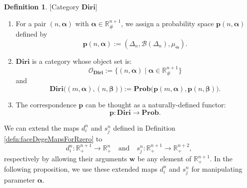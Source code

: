 \documentclass[12pt, a4paper]{amsart}
\theoremstyle{plain}
\theoremstyle{definition}
\newtheorem{defn}[thm]{Definition}
\numberwithin{figure}{section}
\numberwithin{table}{section}
\numberwithin{equation}{section}
\newcommand{\Prob}{\mathbf{Prob}}
\newcommand{\bSigma}{\mathbf{\Sigma}}
\begin{document}
\begin{defn}{[Category $\mathbf{Diri}$]}
\label{defn:catDiri}
\begin{enumerate}
\item
For
a pair
$
	(n, \boldsymbol{\alpha})
$
with
$
	\boldsymbol{\alpha}
		\in
	\mathbb{R}_{\#}^{n+1}
$,
we assign a probability space
$
\mathbf{p}
	(n, \boldsymbol{\alpha})
$
defined by
\begin{equation}
\label{eq:diriProbSp}
\mathbf{p}
(n, \boldsymbol{\alpha})
		:=
(
	\Delta_n, \mathcal{B}(\Delta_n),
	\mu_{
		\boldsymbol{\alpha}
	}
) .
\end{equation}

\item
$
\mathbf{Diri}
$
is a category
whose object set is:
\begin{equation}
\label{eq:catDiriObj}
\mathcal{O}_{\mathbf{Diri}}
	:=
\{
	(n, \boldsymbol{\alpha})
\mid
	\boldsymbol{\alpha}
		\in
	\mathbb{R}_{\#}^{n+1}
\}
\end{equation}
and
\begin{equation}
\label{eq:catDiriArrow}
\mathbf{Diri}
\big(
	(m, \boldsymbol{\alpha}),
	(n, \boldsymbol{\beta})
\big)
		:=
\Prob\big(
	\mathbf{p}(m, \boldsymbol{\alpha}),
	\mathbf{p}(n, \boldsymbol{\beta})
\big) .
\end{equation}

\item
The correspondence
$
\mathbf{p}
$
can be thought as a naturally-defined functor:
\[
\mathbf{p}
	:
\mathbf{Diri}
	\to
\Prob .
\]
\end{enumerate}
\end{defn}




We can extend the maps 
$d^n_i$
and
$s^n_j$
defined in
Definition \ref{defn:faceDegeMapsForRzero}
to
\[
d^n_i
	:
\mathbb{R}_+^{n+1}
	\to
\mathbb{R}_+^{n}
	\quad
\textrm{and}
	\quad
s^n_j
	:
\mathbb{R}_+^{n+1}
	\to
\mathbb{R}_+^{n+2},
\]
respectively
by allowing their arguments
$\mathbf{w}$
be any element of 
$
\mathbb{R}_+^{n+1}
$.
In the following proposition, we use these extended maps
$d^n_i$
and
$s^n_j$
for manipulating parameter
$
\boldsymbol{\alpha}
$.
\end{document}
